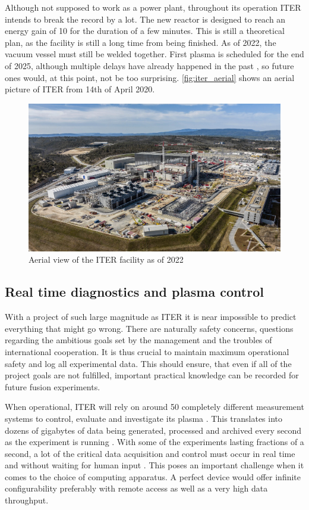 	Although not supposed to work as a power plant, 
	throughout its operation ITER intends to break the record by a lot.
	The new reactor is designed to reach an energy gain of 10 
	for the duration of a few minutes. This is still a theoretical
	plan, as the facility is still a long time from being finished.
	As of 2022, the vacuum vessel must still be welded together\cite{iter_timeline}.
	First plasma is scheduled for the end of 2025\cite{iter_timeline},
	although multiple delays have already happened in the past \cite{iter_delays},
	so future ones would, at this point, not be too surprising. 
	\autoref{fig:iter_aerial} shows an aerial picture of ITER from 14th of April 2020.
	\begin{figure}[H]
	  \centering
	  \includegraphics[width=.8\linewidth]{media/iter_aerial_2022.jpg}
	  \caption{Aerial view of the ITER facility as of 2022 \cite{iter_website}}
	  \label{fig:iter_aerial}
	\end{figure}

\subsection{Real time diagnostics and plasma control}

	With a project of such large magnitude as ITER it is near impossible to predict
	everything that might go wrong. There are naturally safety concerns,
	questions regarding the ambitious goals set by the management and
	the troubles of international cooperation\cite{iter_delays}.
	It is thus crucial to maintain maximum operational safety 
	and log all experimental data. This should ensure, that even if all
	of the project goals are not fulfilled, important practical knowledge
	can be recorded for future fusion experiments.


	When operational, ITER will rely on around 50 completely different
	measurement systems to control, evaluate and investigate its plasma 
	\cite{iter_diagnostics_count}.
	This translates into dozens of gigabytes of data being generated, 
	processed and archived every second as the experiment is running 
	\cite{iter_data_throughput}.
	With some of the experiments lasting fractions of a second,
	a lot of the critical data acquisition and control must occur
	in real time and without waiting for human input 
	\cite{iter_realtime_processing}.
	This poses an important challenge when it comes to the choice
	of computing apparatus. A perfect device would offer
	infinite configurability preferably with remote access 
	as well as a very high data throughput. 


